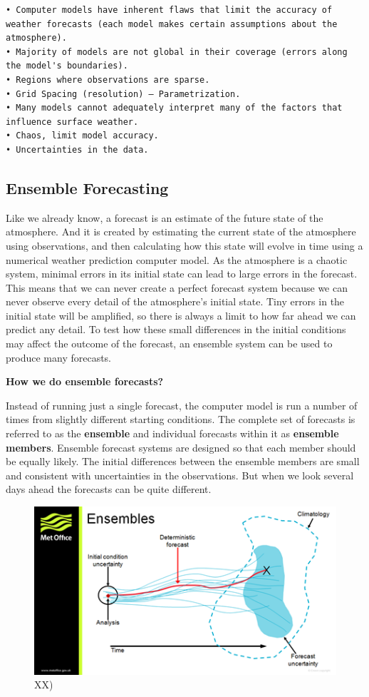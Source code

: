 \documentclass[12pt,oneside]{book}
\begin{document}
\begin{verbatim}
• Computer models have inherent flaws that limit the accuracy of weather forecasts (each model makes certain assumptions about the atmosphere).
• Majority of models are not global in their coverage (errors along the model's boundaries).
• Regions where observations are sparse.
• Grid Spacing (resolution) – Parametrization.
• Many models cannot adequately interpret many of the factors that influence surface weather.
• Chaos, limit model accuracy.
• Uncertainties in the data.
\end{verbatim}

\subsection{Ensemble Forecasting}\label{ensemble-forecasting}

Like we already know, a forecast is an estimate of the future state of
the atmosphere. And it is created by estimating the current state of the
atmosphere using observations, and then calculating how this state will
evolve in time using a numerical weather prediction computer model. As
the atmosphere is a chaotic system, minimal errors in its initial state
can lead to large errors in the forecast. This means that we can never
create a perfect forecast system because we can never observe every
detail of the atmosphere's initial state. Tiny errors in the initial
state will be amplified, so there is always a limit to how far ahead we
can predict any detail. To test how these small differences in the
initial conditions may affect the outcome of the forecast, an ensemble
system can be used to produce many forecasts.

\textbf{How we do ensemble forecasts?}

Instead of running just a single forecast, the computer model is run a
number of times from slightly different starting conditions. The
complete set of forecasts is referred to as the \textbf{ensemble} and
individual forecasts within it as \textbf{ensemble members}. Ensemble
forecast systems are designed so that each member should be equally
likely. The initial differences between the ensemble members are small
and consistent with uncertainties in the observations. But when we look
several days ahead the forecasts can be quite different.

\begin{figure}

{\centering \includegraphics[width=0.8\linewidth]{figures/Figure77} 

}

\caption{XX)}\label{fig:EnsembleForecasting}
\end{figure}
\end{document}
